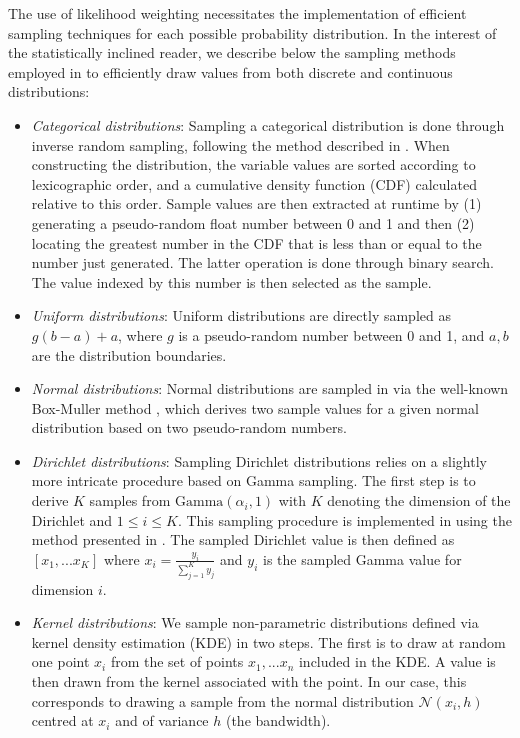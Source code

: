 The use of likelihood weighting necessitates the implementation of efficient sampling techniques for each possible probability distribution.  In the interest of the statistically inclined reader, we describe below the sampling methods employed in \opendial{} to efficiently draw values from both discrete and continuous distributions:
\begin{itemize}
\item \textit{Categorical distributions}:  Sampling a categorical distribution is done through inverse random sampling, following the method described in \cite[][p. 489]{Koller+Friedman:09}. When constructing the distribution, the variable values are sorted according to lexicographic order, and a cumulative density function (CDF) calculated relative to this order.  Sample values are then extracted at runtime by (1) generating a pseudo-random float number between 0 and 1 and then (2) locating the greatest number in the CDF that is less than or equal to the number just generated.  The latter operation is done through binary search. The value indexed by this number is then selected as the sample.
\item \textit{Uniform distributions}:  Uniform distributions are directly sampled as $g (b-a) + a$, where $g$ is a pseudo-random number between 0 and 1, and $a,b$ are the distribution boundaries.

\item \textit{Normal distributions}:  Normal distributions are sampled in \opendial{} via the well-known Box-Muller method \citep{rBOX58a}, which derives two sample values for a given normal distribution based on two pseudo-random numbers.

\item \textit{Dirichlet distributions}:  Sampling Dirichlet distributions relies on a slightly more intricate procedure based on Gamma sampling.   The first step is to derive $K$ samples from $\mathrm{Gamma} (\alpha_i, 1)$ with $K$ denoting the dimension of the Dirichlet and $1 \leq i \leq K$.  This sampling procedure is implemented in \opendial{} using the method presented in \cite{cheng1979}.  The sampled Dirichlet value is then defined as $[x_1,...x_K]$ where $x_i = \frac{y_i}{\sum_{j=1}^K y_j}$ and $y_i$ is the sampled Gamma value for dimension $i$.
\item \textit{Kernel distributions}:  We sample non-parametric distributions defined via kernel density estimation (KDE) in two steps. The first is to draw at random one point $x_i$ from the set of points $x_1,...x_n$ included in the KDE. A value is then drawn from the kernel associated with the point. In our case, this corresponds to drawing a sample from the normal distribution $\mathcal{N}(x_i,h)$ centred at $x_i$ and of variance $h$ (the bandwidth). 
\end{itemize}


